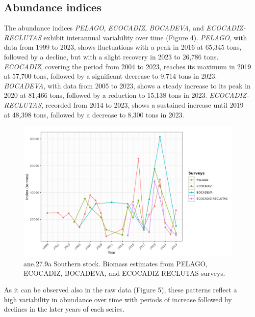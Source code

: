 \documentclass[
]{article}
\begin{document}
\hypertarget{abundance-indices}{%
\subsection{Abundance indices}\label{abundance-indices}}

The abundance indices \emph{PELAGO}, \emph{ECOCADIZ}, \emph{BOCADEVA},
and \emph{ECOCADIZ-RECLUTAS} exhibit interannual variability over time
(Figure 4). \emph{PELAGO}, with data from 1999 to 2023, shows
fluctuations with a peak in 2016 at 65,345 tons, followed by a decline,
but with a slight recovery in 2023 to 26,786 tons. \emph{ECOCADIZ},
covering the period from 2004 to 2023, reaches its maximum in 2019 at
57,700 tons, followed by a significant decrease to 9,714 tons in 2023.
\emph{BOCADEVA}, with data from 2005 to 2023, shows a steady increase to
its peak in 2020 at 81,466 tons, followed by a reduction to 15,138 tons
in 2023. \emph{ECOCADIZ-RECLUTAS}, recorded from 2014 to 2023, shows a
sustained increase until 2019 at 48,398 tons, followed by a decrease to
8,300 tons in 2023.

\begin{figure}[H]

{\centering \includegraphics[width=0.95\linewidth]{report/run/S1.0_4FLEETS_SelECO_RecIndex_Mnewfix//fig_indiceBiomass} 

}

\caption{ane.27.9a Southern stock. Biomass estimates from PELAGO, ECOCADIZ, BOCADEVA, and ECOCADIZ-RECLUTAS surveys.}\label{fig:unnamed-chunk-31}
\end{figure}

As it can be observed also in the raw data (Figure 5), these patterns
reflect a high variability in abundance over time with periods of
increase followed by declines in the later years of each series.
\end{document}
